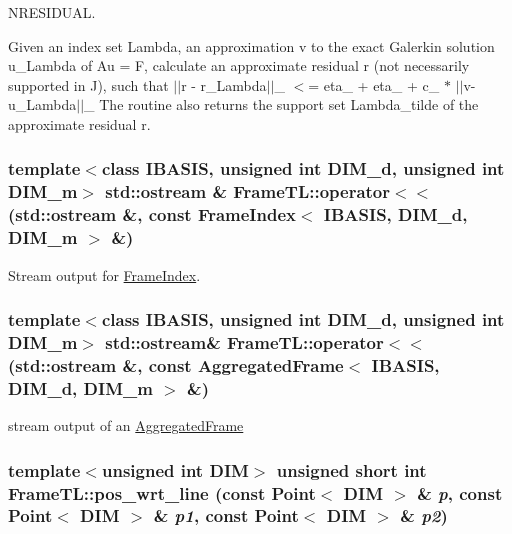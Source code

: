 NRESIDUAL. 

Given an index set Lambda, an approximation v to the exact Galerkin solution u\_\-Lambda of Au = F, calculate an approximate residual r (not necessarily supported in J), such that $|$$|$r - r\_\-Lambda$|$$|$\_ $<$= eta\_ + eta\_ + c\_ $\ast$ $|$$|$v-u\_\-Lambda$|$$|$\_ The routine also returns the support set Lambda\_\-tilde of the approximate residual r. \hypertarget{namespaceFrameTL_4f787a15e5a101207d222e0a799a7e5d}{
\subsubsection[operator$<$$<$]{\setlength{\rightskip}{0pt plus 5cm}template$<$class IBASIS, unsigned int DIM\_\-d, unsigned int DIM\_\-m$>$ std::ostream \& FrameTL::operator$<$$<$ (std::ostream \&, \/  const FrameIndex$<$ IBASIS, DIM\_\-d, DIM\_\-m $>$ \&)}}
\label{namespaceFrameTL_4f787a15e5a101207d222e0a799a7e5d}


Stream output for \hyperlink{classFrameTL_1_1FrameIndex}{FrameIndex}. \hypertarget{namespaceFrameTL_218a9a8d5b69562375139a49043fce0b}{
\subsubsection[operator$<$$<$]{\setlength{\rightskip}{0pt plus 5cm}template$<$class IBASIS, unsigned int DIM\_\-d, unsigned int DIM\_\-m$>$ std::ostream\& FrameTL::operator$<$$<$ (std::ostream \&, \/  const AggregatedFrame$<$ IBASIS, DIM\_\-d, DIM\_\-m $>$ \&)}}
\label{namespaceFrameTL_218a9a8d5b69562375139a49043fce0b}


stream output of an \hyperlink{classFrameTL_1_1AggregatedFrame}{AggregatedFrame} \hypertarget{namespaceFrameTL_d4045e5ba1e89e5fbdd9084024f16ae0}{
\subsubsection[pos\_\-wrt\_\-line]{\setlength{\rightskip}{0pt plus 5cm}template$<$unsigned int DIM$>$ unsigned short int FrameTL::pos\_\-wrt\_\-line (const Point$<$ DIM $>$ \& {\em p}, \/  const Point$<$ DIM $>$ \& {\em p1}, \/  const Point$<$ DIM $>$ \& {\em p2})}}
\label{namespaceFrameTL_d4045e5ba1e89e5fbdd9084024f16ae0}


